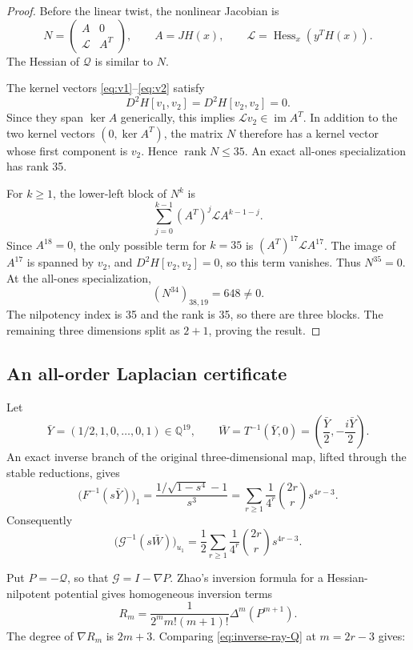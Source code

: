 \documentclass[11pt,reqno]{amsart}
\begin{document}
\begin{proof}
Before the linear twist, the nonlinear Jacobian is
\[
N=
\begin{pmatrix}
A&0\\
\mathcal L&A^T
\end{pmatrix},
\qquad
A=JH(x),\qquad
\mathcal L=\operatorname{Hess}_x(y^TH(x)).
\]
The Hessian of \(\mathcal Q\) is similar to \(N\).

The kernel vectors \eqref{eq:v1}--\eqref{eq:v2} satisfy
\[
D^2H[v_1,v_2]=D^2H[v_2,v_2]=0.
\]
Since they span \(\ker A\) generically, this implies
\(\mathcal Lv_2\in\operatorname{im}A^T\).  In addition to the two kernel
vectors \((0,\ker A^T)\), the matrix \(N\) therefore has a kernel vector
whose first component is \(v_2\).  Hence \(\operatorname{rank}N\le35\).
An exact all-ones specialization has rank 35.

For \(k\ge1\), the lower-left block of \(N^k\) is
\[
\sum_{j=0}^{k-1}(A^T)^j\mathcal L A^{k-1-j}.
\]
Since \(A^{18}=0\), the only possible term for \(k=35\) is
\((A^T)^{17}\mathcal L A^{17}\).  The image of \(A^{17}\) is spanned by
\(v_2\), and \(D^2H[v_2,v_2]=0\), so this term vanishes.  Thus \(N^{35}=0\).
At the all-ones specialization,
\[
(N^{34})_{38,19}=648\ne0.
\]
The nilpotency index is 35 and the rank is 35, so there are three blocks.
The remaining three dimensions split as \(2+1\), proving the result.
\end{proof}

\subsection{An all-order Laplacian certificate}

Let
\[
\bar Y=(1/2,1,0,\ldots,0,1)\in\mathbb Q^{19},
\qquad
\bar W=T^{-1}(\bar Y,0)
=\left(\frac{\bar Y}{2},-\frac{i\bar Y}{2}\right).
\]
An exact inverse branch of the original three-dimensional map, lifted through
the stable reductions, gives
\begin{equation}
\label{eq:inverse-ray-G}
\bigl(F^{-1}(s\bar Y)\bigr)_1
=\frac{1/\sqrt{1-s^4}-1}{s^3}
=\sum_{r\ge1}\frac1{4^r}\binom{2r}{r}s^{4r-3}.
\end{equation}
Consequently
\begin{equation}
\label{eq:inverse-ray-Q}
\bigl(\mathcal G^{-1}(s\bar W)\bigr)_{u_1}
=\frac12\sum_{r\ge1}\frac1{4^r}\binom{2r}{r}s^{4r-3}.
\end{equation}

Put \(P=-\mathcal Q\), so that
\(\mathcal G=I-\nabla P\).  Zhao's inversion formula for a
Hessian-nilpotent potential gives homogeneous inversion terms
\cite{zhao2007hessian}
\[
R_m=
\frac{1}{2^m m!(m+1)!}\Delta^m(P^{m+1}).
\]
The degree of \(\nabla R_m\) is \(2m+3\).  Comparing
\eqref{eq:inverse-ray-Q} at \(m=2r-3\) gives:
\end{document}
